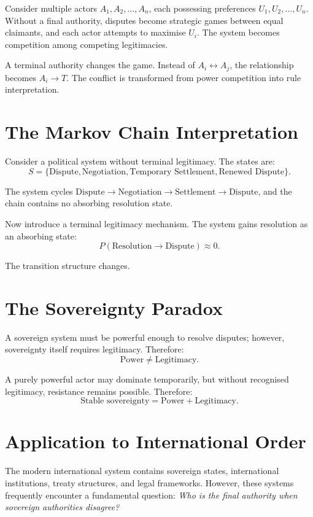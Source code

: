\documentclass[11pt,openany]{book}
\theoremstyle{plain}
\theoremstyle{definition}
\begin{document}
Consider multiple actors \(A_1, A_2, \ldots, A_n\), each possessing preferences \(U_1, U_2, \ldots, U_n\). Without a final authority, disputes become strategic games between equal claimants, and each actor attempts to maximise \(U_i\). The system becomes competition among competing legitimacies.

A terminal authority changes the game. Instead of \(A_i \leftrightarrow A_j\), the relationship becomes \(A_i \to T\). The conflict is transformed from power competition into rule interpretation.

\section*{The Markov Chain Interpretation}

Consider a political system without terminal legitimacy. The states are:
\[
S = \{\text{Dispute}, \text{Negotiation}, \text{Temporary Settlement}, \text{Renewed Dispute}\}.
\]

The system cycles \(\text{Dispute} \to \text{Negotiation} \to \text{Settlement} \to \text{Dispute}\), and the chain contains no absorbing resolution state. 

Now introduce a terminal legitimacy mechanism. The system gains resolution as an absorbing state:
\[
P(\text{Resolution} \to \text{Dispute}) \approx 0.
\]

The transition structure changes.

\section*{The Sovereignty Paradox}

A sovereign system must be powerful enough to resolve disputes; however, sovereignty itself requires legitimacy. Therefore:
\[
\text{Power} \neq \text{Legitimacy}.
\]

A purely powerful actor may dominate temporarily, but without recognised legitimacy, resistance remains possible. Therefore:
\[
\text{Stable sovereignty} = \text{Power} + \text{Legitimacy}.
\]

\section*{Application to International Order}

The modern international system contains sovereign states, international institutions, treaty structures, and legal frameworks. However, these systems frequently encounter a fundamental question: \textit{Who is the final authority when sovereign authorities disagree?}
\end{document}
